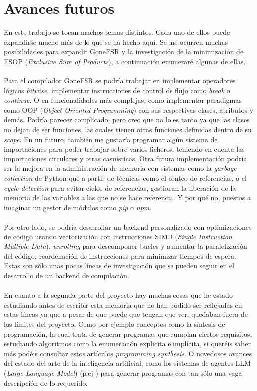 \section{Avances futuros}
En este trabajo se tocan muchos temas distintos. Cada uno de ellos puede expandirse mucho más de lo que se ha hecho aquí. Se me ocurren muchas posibilidades para expandir GoneFSR y la investigación de la minimización de ESOP (\textit{Exclusive Sum of Products}), a continuación enumeraré algunas de ellas.\\\\
Para el compilador GoneFSR se podría trabajar en implementar operadores lógicos \textit{bitwise}, implementar instrucciones de control de flujo como \textit{break} o \textit{continue}. O en funcionalidades más complejas, como implementar paradigmas como OOP (\textit{Object Oriented Programming}) con sus respectivas clases, atributos y demás. Podría parecer complicado, pero creo que no lo es tanto ya que las clases no dejan de ser funciones, las cuales tienen otras funciones definidas dentro de su \textit{scope}. En un futuro, también me gustaría programar algún sistema de importaciones para poder trabajar sobre varios ficheros, teniendo en cuenta las importaciones circulares y otras casuísticas. Otra futura implementación podría ser la mejora en la administración de memoria con sistemas como la \textit{garbage collection} de Python que a partir de técnicas como el conteo de referencias, o el \textit{cycle detection} para evitar ciclos de referencias, gestionan la liberación de la memoria de las variables a las que no se hace referencia. Y por qué no, puestos a imaginar un gestor de módulos como \textit{pip} o \textit{npm}.\\\\
Por otro lado, se podría desarrollar un backend personalizado con optimizaciones de código usando vectorización con instrucciones SIMD (\textit{Single Instruction Multiple Data}), \textit{unrolling} para descomponer bucles y aumentar la paralelización del código, reordenación de instrucciones para minimizar tiempos de espera. Estas son sólo unas pocas líneas de investigación que se pueden seguir en el desarrollo de un backend de compilación.\\\\
En cuanto a la segunda parte del proyecto hay muchas cosas que he estado estudiando antes de escribir esta memoria que no han podido ser reflejadas en estas líneas ya que a pesar de que puede que tengan que ver, quedaban fuera de los límites del proyecto. Como por ejemplo conceptos como la síntesis de programación, la cual trata de generar programas que cumplan ciertos requisitos, estudiando algoritmos como la enumeración explicita e implícita, si queréis saber más podéis consultar estos artículos \href{https://people.csail.mit.edu/asolar/SynthesisCourse/Lecture1.htm}{\textit{programming synthesis}}. O novedosos avances del estado del arte de la inteligencia artificial, como los sistemas de agentes LLM (\textit{Large Language Model}) (p.ej \cite{islam2024mapcoder}) para generar programas con tan sólo una vaga descripción de lo requerido.\\\\
